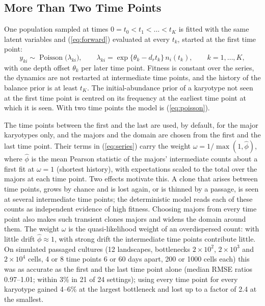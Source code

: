 \documentclass[11pt]{article}
\begin{document}
\subsection{More Than Two Time Points}
\label{sec:sj-series}

One population sampled at times $0=t_0<t_1<\dots<t_K$ is fitted with the same
latent variables and (\ref{eq:forward}) evaluated at every $t_k$, started at
the first time point:
\begin{equation}
  y_{ki}\sim\operatorname{Poisson}\bigl(\lambda_{ki}\bigr),
  \qquad
  \lambda_{ki}=\exp\bigl\{\theta_k-d_rt_k\bigr\}\,n_i(t_k),
  \qquad k=1,\dots,K,
  \label{eq:series}
\end{equation}
with one depth offset $\theta_k$ per later time point. Fitness is constant over
the series, the dynamics are not restarted at intermediate time points, and the
history of the balance prior is at least $t_K$. The initial-abundance prior of
a karyotype not seen at the first time point is centred on its frequency at the
earliest time point at which it is seen. With two time points the model is
(\ref{eq:poisson}).

The time points between the first and the last are used, by default, for the
major karyotypes only, and the majors and the domain are chosen from the first
and the last time point. Their terms in (\ref{eq:series}) carry the weight
$\omega=1/\max(1,\hat\phi)$, where $\hat\phi$ is the mean Pearson statistic
of the majors' intermediate counts about a first fit at $\omega=1$ (shortest
history), with expectations scaled to the total over the majors at each time point. Two
effects motivate this. A clone that arises between time points, grows by chance
and is lost again, or is thinned by a passage, is seen at several
intermediate time points; the deterministic model reads each of these counts as
independent evidence of high fitness. Choosing majors from every time point also
makes such transient clones majors and widens the domain around them. The
weight $\omega$ is the quasi-likelihood weight of an overdispersed count: with
little drift $\hat\phi\approx1$, with strong drift the intermediate time points
contribute little. On simulated passaged cultures (12 landscapes, bottlenecks
$2\times10^2$, $2\times10^3$ and $2\times10^4$ cells, 4 or 8 time points 6 or 60
days apart, 200 or 1000 cells each) this was as accurate as the first and the
last time point alone (median RMSE ratios 0.97--1.01; within 3\% in 21 of 24
settings); using every time point for every karyotype gained 4--6\% at the
largest bottleneck and lost up to a factor of 2.4 at the smallest.
\end{document}
